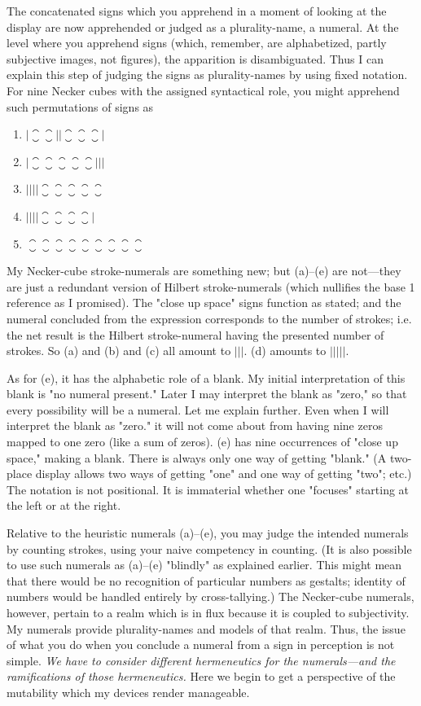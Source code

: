 The concatenated signs which you apprehend in a moment of 
looking at the display are now apprehended or judged as a 
plurality-name, a numeral. At the level where you apprehend signs (which, 
remember, are alphabetized, partly subjective images, not figures), the 
apparition is disambiguated. Thus I can explain this step of judging the 
signs as plurality-names by using fixed notation. For nine Necker cubes 
with the assigned syntactical role, you might apprehend such 
permutations of signs as 
\begin{enumerate}[label=\alpha*.]
	\item $|\closure\closure||\closure\closure\closure|$
	\item $|\closure\closure\closure\closure\closure|||$
	\item $||||\closure\closure\closure\closure\closure$
	\item $||||\closure\closure\closure\closure|$
	\item $\closure\closure\closure\closure\closure\closure\closure\closure\closure$
\end{enumerate}

My Necker-cube stroke-numerals are something new; but (a)--(e) are 
not---they are just a redundant version of Hilbert stroke-numerals 
(which nullifies the base 1 reference as I promised). The "close up 
space" signs function as stated; and the numeral concluded from the 
expression corresponds to the number of strokes; i.e. the net result is 
the Hilbert stroke-numeral having the presented number of strokes. So 
(a) and (b) and (c) all amount to $|||$. (d) amounts to $|||||$.

As for (e), it has the alphabetic role of a blank. My initial interpretation 
of this blank is "no numeral present." Later I may interpret the 
blank as "zero," so that every possibility will be a numeral. Let me 
explain further. Even when I will interpret the blank as "zero." it will 
not come about from having nine zeros mapped to one zero (like a sum 
of zeros). (e) has nine occurrences of "close up space," making a blank. 
There is always only one way of getting "blank." (A two-place display 
allows two ways of getting "one" and one way of getting "two"; etc.) 
The notation is not positional. It is immaterial whether one "focuses" 
starting at the left or at the right. 

Relative to the heuristic numerals (a)--(e), you may judge the 
intended numerals by counting strokes, using your naive competency 
in counting. (It is also possible to use such numerals as (a)--(e) "blindly" 
as explained earlier. This might mean that there would be no recognition 
of particular numbers as gestalts; identity of numbers would be
handled entirely by cross-tallying.) The Necker-cube numerals, however, 
pertain to a realm which is in flux because it is coupled to 
subjectivity. My numerals provide plurality-names and models of that 
realm. Thus, the issue of what you do when you conclude a numeral 
from a sign in perception is not simple. \emph{We have to consider different 
hermeneutics for the numerals---and the ramifications of those hermeneutics.}
Here we begin to get a perspective of the mutability which my 
devices render manageable. 


